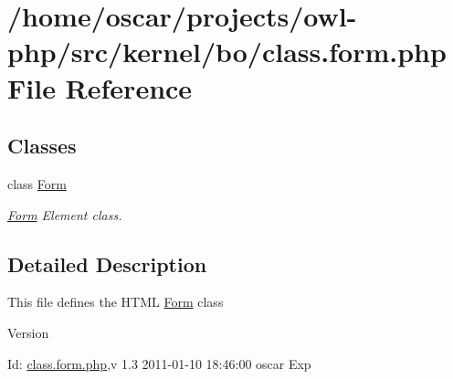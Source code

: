 \section{/home/oscar/projects/owl-\/php/src/kernel/bo/class.form.php File Reference}
\label{class_8form_8php}
\subsection*{Classes}
\begin{DoxyCompactItemize}
\item 
class \hyperlink{classForm}{Form}
\begin{DoxyCompactList}\small\item\em \hyperlink{classForm}{Form} Element class. \item\end{DoxyCompactList}\end{DoxyCompactItemize}


\subsection{Detailed Description}
This file defines the HTML \hyperlink{classForm}{Form} class \begin{DoxyVersion}{Version}

\end{DoxyVersion}
\begin{DoxyParagraph}{Id:}
\hyperlink{class_8form_8php}{class.form.php},v 1.3 2011-\/01-\/10 18:46:00 oscar Exp 
\end{DoxyParagraph}
